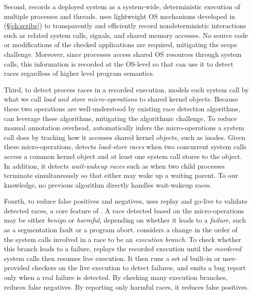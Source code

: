 Second, \racepro records a deployed system as a system-wide, deterministic
execution of multiple processes and threads. \racepro uses lightweight OS
mechanisms developed in \scribe (\S\ref{ch:scribe})
to transparently and efficiently record nondeterministic interactions
such as related system calls, signals, and shared memory accesses.
No source code or modifications of
the checked applications are required, mitigating the scope challenge.
Moreover, since processes access shared OS resources through system
calls, this information is recorded at the OS-level so that \racepro can
use it to detect races regardless of higher level program semantics.  

Third, to detect process races in a recorded execution,
\racepro models each system call by what we call
\emph{load and store micro-operations} to shared kernel objects. 
Because these two operations are well-understood by existing race
detection algorithms, \racepro can leverage these
algorithms, mitigating the algorithmic challenge.  To reduce manual
annotation overhead, \racepro automatically infers
the micro-operations a system call does by tracking how it
accesses shared kernel objects, such as inodes.  
Given these micro-operations, \racepro detects \emph{load-store
races} when two concurrent system calls access a common kernel object
and at least one system call stores to the object.
In addition, it detects \emph{wait-wakeup races} such as
when two child processes terminate simultaneously 
so that either may wake up a waiting parent.
To our knowledge, no previous algorithm directly handles wait-wakeup races.

Fourth, to reduce false positives and negatives, \racepro uses
replay and go-live to validate detected races, a core feature of \scribe.
A race detected based on the micro-operations may be either \emph{benign}
or \emph{harmful}, depending on whether it leads to a \emph{failure}, such
as a segmentation fault or a program abort.
\racepro considers a change in the order of the system
calls involved in a race to be an \emph{execution branch}.  To check
whether this branch leads 
to a failure, \racepro replays the recorded execution until the \emph{reordered}
system calls then resumes live execution.  It then runs a set of built-in or
user-provided checkers on the live execution to detect failures,
and emits a bug report only when a real failure is detected.
By checking many execution branches,
\racepro reduces false negatives.  By reporting only harmful races, it
reduces false positives. 

